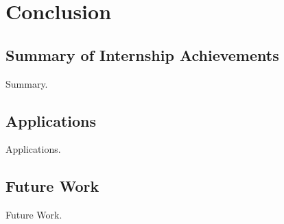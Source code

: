 \chapter{Conclusion}

\label{ch:conclusions}

\section{Summary of Internship Achievements}

Summary.


\section{Applications}

Applications.


\section{Future Work}

Future Work.
